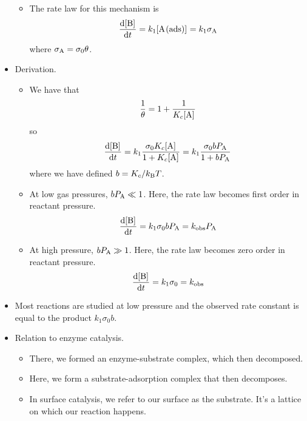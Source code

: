 \documentclass[../notes.tex]{subfiles}
\begin{document}
\begin{itemize}
\begin{itemize}
\begin{equation*}
        \end{equation*}
        \item The rate law for this mechanism is
        \begin{equation*}
            \dv{\cnc{B}}{t} = k_1\cnc{A(ads)} = k_1\sigma_{\ce{A}}
        \end{equation*}
        where $\sigma_{\ce{A}}=\sigma_0\theta$.
    \end{itemize}
    \item Derivation.
    \begin{itemize}
        \item We have that
        \begin{equation*}
            \frac{1}{\theta} = 1+\frac{1}{K_c\cnc{A}}
        \end{equation*}
        so
        \begin{equation*}
            \dv{\cnc{B}}{t} = k_1\frac{\sigma_0K_c\cnc{A}}{1+K_c\cnc{A}}
            = k_1\frac{\sigma_0bP_{\ce{A}}}{1+bP_{\ce{A}}}
        \end{equation*}
        where we have defined $b=K_c/k_\text{B} T$.
        \item At low gas pressures, $bP_{\ce{A}}\ll 1$. Here, the rate law becomes first order in reactant pressure.
        \begin{equation*}
            \dv{\cnc{B}}{t} = k_1\sigma_0bP_{\ce{A}}
            = k_\text{obs}P_{\ce{A}}
        \end{equation*}
        \item At high pressure, $bP_{\ce{A}}\gg 1$. Here, the rate law becomes zero order in reactant pressure.
        \begin{equation*}
            \dv{\cnc{B}}{t} = k_1\sigma_0
            = k_\text{obs}
        \end{equation*}
    \end{itemize}
    \item Most reactions are studied at low pressure and the observed rate constant is equal to the product $k_1\sigma_0b$.
    \item Relation to enzyme catalysis.
    \begin{itemize}
        \item There, we formed an enzyme-substrate complex, which then decomposed.
        \item Here, we form a substrate-adsorption complex that then decomposes.
        \item In surface catalysis, we refer to our surface as the substrate. It's a lattice on which our reaction happens.

\end{itemize}
\end{itemize}
\end{document}
